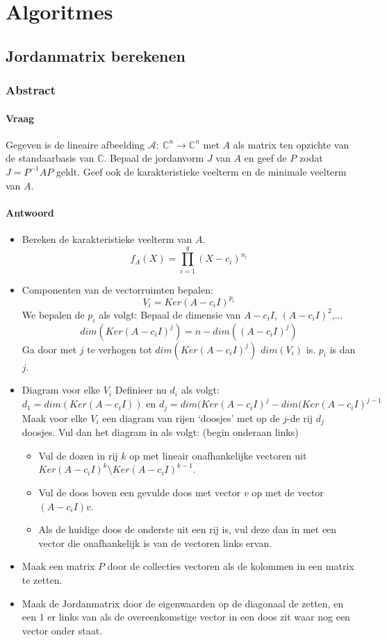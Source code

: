 \documentclass[main.tex]{subfiles}
\begin{document}
\chapter{Algoritmes}
\label{cha:algoritmes}

\section{Jordanmatrix berekenen}

\subsection*{Abstract}

\subsubsection*{Vraag}
Gegeven is de lineaire afbeelding $\mathcal{A}:\ \mathbb{C}^{n} \rightarrow \mathbb{C}^{n}$ met $A$ als matrix ten opzichte van de standaarbasis van $\mathbb{C}$.
Bepaal de jordanvorm $J$ van $A$ en geef de $P$ zodat $J=P^{-1}AP$ geldt.
Geef ook de karakteristieke veelterm en de minimale veelterm van $A$.
\subsubsection*{Antwoord}
\begin{itemize}
\item Bereken de karakteristieke veelterm van $A$.
  \[ f_{A}(X) = \prod_{i=1}^{q}(X-c_{i})^{n_{i}} \]
\item Componenten van de vectorruimten bepalen:
  \[ V_{i} = Ker(A-c_{i}I)^{p_{i}} \]
  We bepalen de $p_{i}$ als volgt:
  Bepaal de dimensie van $A-c_{i}I$, $(A-c_{i}I)^{2}$,...
  \[ dim(Ker(A-c_{i}I)^{j}) = n-dim((A-c_{i}I)^{j}) \]
  Ga door met $j$ te verhogen tot $dim(Ker(A-c_{i}I)^{j})$ $dim(V_{i})$ is.
  $p_{i}$ is dan $j$.
\item Diagram voor elke $V_{i}$
  Definieer nu $d_{i}$ als volgt:
  \[ d_{1} = dim(Ker(A-c_{i}I)) \text{ en } d_{j} = dim(Ker(A-c_{i}I)^{j}-dim(Ker(A-c_{i}I)^{j-1} \]
  Maak voor elke $V_{i}$ een diagram van rijen `doosjes' met op de $j$-de rij $d_{j}$ doosjes.
  Vul dan het diagram in als volgt: (begin onderaan links)
  \begin{itemize}
  \item Vul de dozen in rij $k$ op met lineair onafhankelijke vectoren uit $Ker(A-c_{i}I)^{k}\setminus Ker(A-c_{i}I)^{k-1}$.
  \item Vul de doos boven een gevulde doos met vector $v$ op met de vector $(A-c_{i}I)v$.
  \item Als de huidige doos de onderste uit een rij is, vul deze dan in met een vector die onafhankelijk is van de vectoren links ervan.
  \end{itemize}
\item Maak een matrix $P$ door de collecties vectoren als de kolommen in een matrix te zetten.
\item Maak de Jordanmatrix door de eigenwaarden op de diagonaal de zetten, en een $1$ er links van als de overeenkomstige vector in een doos zit waar nog een vector onder staat.
\end{itemize}
\end{document}
